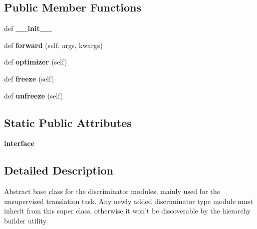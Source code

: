 \subsection*{Public Member Functions}
\begin{DoxyCompactItemize}
\item 
def {\bfseries \+\_\+\+\_\+init\+\_\+\+\_\+}\hypertarget{classutils_1_1Classifier_af4e343de12b5e4bbdc597bf83e09e074}{}\label{classutils_1_1Classifier_af4e343de12b5e4bbdc597bf83e09e074}

\item 
def {\bfseries forward} (self, args, kwargs)\hypertarget{classutils_1_1Classifier_ac953237bb39ddf21b4c4417704acbdb3}{}\label{classutils_1_1Classifier_ac953237bb39ddf21b4c4417704acbdb3}

\item 
def {\bfseries optimizer} (self)\hypertarget{classutils_1_1Classifier_a38fc9590b1eee361c3649e49b99905a8}{}\label{classutils_1_1Classifier_a38fc9590b1eee361c3649e49b99905a8}

\item 
def {\bfseries freeze} (self)\hypertarget{classutils_1_1Classifier_a77f6d76d07a2ee3cff6f80b4191865b2}{}\label{classutils_1_1Classifier_a77f6d76d07a2ee3cff6f80b4191865b2}

\item 
def {\bfseries unfreeze} (self)\hypertarget{classutils_1_1Classifier_a2c8049a8b7af725e0905e6228a7508e3}{}\label{classutils_1_1Classifier_a2c8049a8b7af725e0905e6228a7508e3}

\end{DoxyCompactItemize}
\subsection*{Static Public Attributes}
\begin{DoxyCompactItemize}
\item 
{\bfseries interface}
\end{DoxyCompactItemize}


\subsection{Detailed Description}
\begin{DoxyVerb}Abstract base class for the discriminator modules, mainly used for the unsupervised
translation task. Any newly added discriminator type module must inherit from this
super class, otherwise it won't be discoverable by the hierarchy builder utility.
\end{DoxyVerb}
 


